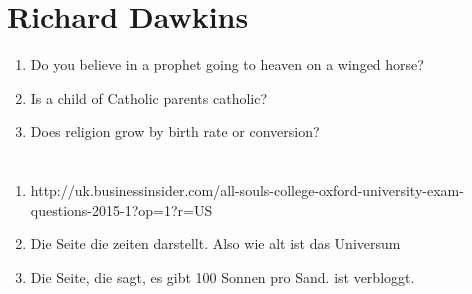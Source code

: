 \documentclass[10pt,a4paper]{article}
\begin{document}
\clearpage
\section{Richard Dawkins}
\begin{enumerate}
	\item Do you believe in a prophet going to heaven on a winged horse?
	\item Is a child of Catholic parents catholic?
	\item Does religion grow by birth rate or conversion?
\end{enumerate}

\clearpage
\section{}
\begin{enumerate}
	\item http://uk.businessinsider.com/all-souls-college-oxford-university-exam-questions-2015-1?op=1?r=US
	\item Die Seite die zeiten darstellt. Also wie alt ist das Universum
	\item Die Seite, die sagt, es gibt 100 Sonnen pro Sand. ist verbloggt.
\end{enumerate}
\end{document}

